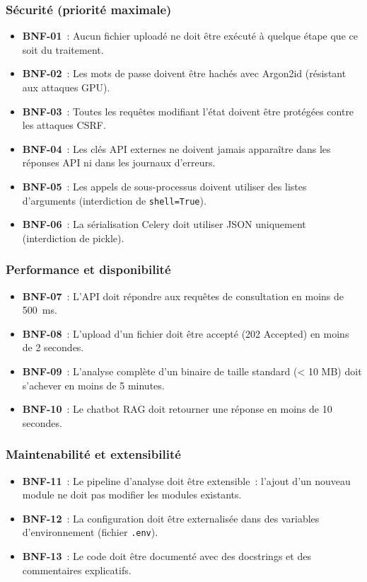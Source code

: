 \subsubsection{Sécurité (priorité maximale)}
\begin{itemize}
  \item \textbf{BNF-01}~: Aucun fichier uploadé ne doit être exécuté à quelque étape que ce soit du traitement.
  \item \textbf{BNF-02}~: Les mots de passe doivent être hachés avec Argon2id (résistant aux attaques GPU).
  \item \textbf{BNF-03}~: Toutes les requêtes modifiant l'état doivent être protégées contre les attaques CSRF.
  \item \textbf{BNF-04}~: Les clés API externes ne doivent jamais apparaître dans les réponses API ni dans les journaux d'erreurs.
  \item \textbf{BNF-05}~: Les appels de sous-processus doivent utiliser des listes d'arguments (interdiction de \texttt{shell=True}).
  \item \textbf{BNF-06}~: La sérialisation Celery doit utiliser JSON uniquement (interdiction de pickle).
\end{itemize}

\subsubsection{Performance et disponibilité}
\begin{itemize}
  \item \textbf{BNF-07}~: L'API doit répondre aux requêtes de consultation en moins de 500~ms.
  \item \textbf{BNF-08}~: L'upload d'un fichier doit être accepté (202 Accepted) en moins de 2 secondes.
  \item \textbf{BNF-09}~: L'analyse complète d'un binaire de taille standard (< 10 MB) doit s'achever en moins de 5 minutes.
  \item \textbf{BNF-10}~: Le chatbot RAG doit retourner une réponse en moins de 10 secondes.
\end{itemize}

\subsubsection{Maintenabilité et extensibilité}
\begin{itemize}
  \item \textbf{BNF-11}~: Le pipeline d'analyse doit être extensible~: l'ajout d'un nouveau module ne doit pas modifier les modules existants.
  \item \textbf{BNF-12}~: La configuration doit être externalisée dans des variables d'environnement (fichier \texttt{.env}).
  \item \textbf{BNF-13}~: Le code doit être documenté avec des docstrings et des commentaires explicatifs.
\end{itemize}

